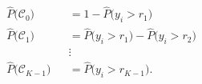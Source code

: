 \begin{equation}
  \begin{alignedat}{2}
    &\widehat{P}\big(\mathcal{C}_0 \big) &&= 1 - \widehat{P}\big(y_i > r_1\big) \\
    &\widehat{P}\big(\mathcal{C}_1 \big) &&= \widehat{P}\big(y_i > r_1\big) - \widehat{P}\big(y_i > r_2\big) \\
    & &&\vdots \\
    &\widehat{P}\big(\mathcal{C}_{K-1} \big) &&= \widehat{P}\big(y_i > r_{K-1}\big).
  \end{alignedat}
\end{equation}


